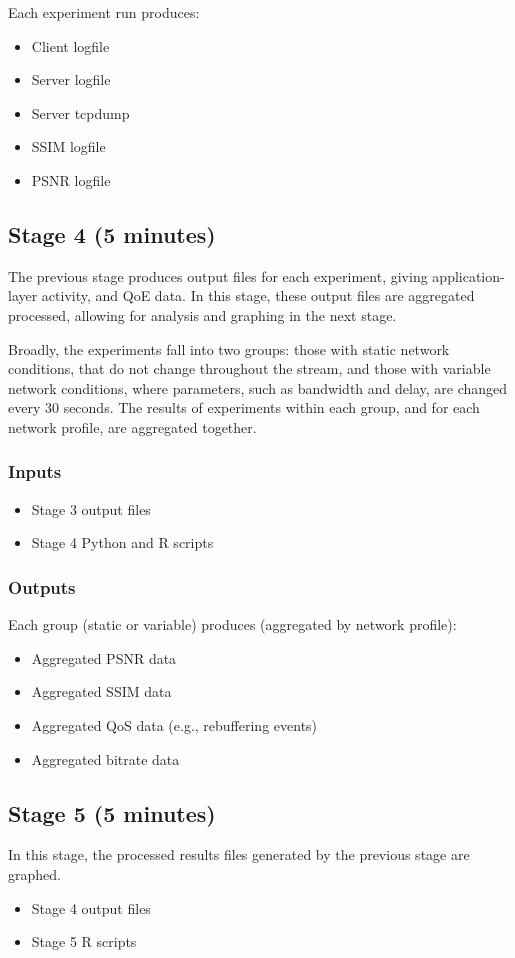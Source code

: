 \documentclass[sigconf]{acmart}
\begin{document}
Each experiment run produces:
\begin{itemize}
\item Client logfile
\item Server logfile
\item Server tcpdump
\item SSIM logfile
\item PSNR logfile
\end{itemize}

\subsection*{Stage 4 (5 minutes)}
The previous stage produces output files for each experiment, giving application-layer
activity, and QoE data. In this stage, these output files are aggregated processed,
allowing for analysis and graphing in the next stage.

Broadly, the experiments fall into two groups: those with static network conditions, that
do not change throughout the stream, and those with variable network conditions, where
parameters, such as bandwidth and delay, are changed every 30 seconds. The results of
experiments within each group, and for each network profile, are aggregated together.

\subsubsection*{Inputs}
\begin{itemize}
\item Stage 3 output files
\item Stage 4 Python and R scripts
\end{itemize}
\subsubsection*{Outputs}

Each group (static or variable) produces (aggregated by network profile):
\begin{itemize}
\item Aggregated PSNR data
\item Aggregated SSIM data
\item Aggregated QoS data (e.g., rebuffering events)
\item Aggregated bitrate data
\end{itemize}

\subsection*{Stage 5 (5 minutes)}
In this stage, the processed results files generated by the previous stage are graphed.
\begin{itemize}
\item Stage 4 output files
\item Stage 5 R scripts
\end{itemize}
\end{document}
